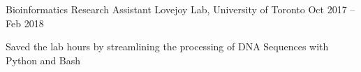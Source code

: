 \begin{cventries}
  \cventry
    {Bioinformatics Research Assistant}
    {Lovejoy Lab, University of Toronto}
    {}
    {Oct 2017 -- Feb 2018}
    {}
    {
      \begin{cvitems}
        \item {Saved the lab hours by streamlining the processing of DNA Sequences with Python and Bash}
      \end{cvitems}
    }
\end{cventries}
